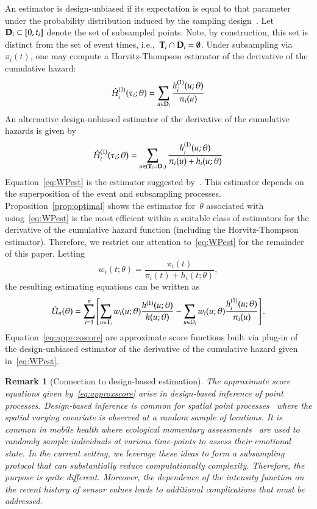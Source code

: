 \documentclass[11pt]{amsart}
\newtheorem{rmk}[thm]{Remark}%
\def\bfT{{\bf T}}
\def\bfD{{\bf D}}
\begin{document}
An estimator is design-unbiased if its expectation is equal to that parameter under the probability distribution induced by the sampling design~\citep{Cassel1977}. Let~$\bfD_i \subset [0,t_i]$ denote the set of subsampled points.  Note, by construction, this set is distinct from the set of event times, i.e.,~$\bfT_i \cap \bfD_i = \emptyset$.  Under subsampling via $\pi_i (t)$, one may compute a Horvitz-Thompson estimator of the derivative of the cumulative hazard:
\[
\hat H_{i}^{(1)} (\tau_i; \theta) = \sum_{u \in \bfD_i} \frac{
  h^{(1)}_i (u; \theta) }{ \pi_i (u) }
\]
An alternative design-unbiased estimator of the derivative of the cumulative hazards is given by
\begin{equation}
\label{eq:WPest}
\hat H_{i}^{(1)} (\tau_i; \theta) = \sum_{u \in (\bfT_i \cup \bfD_i)}
\frac{ h^{(1)}_i ( u; \theta ) }{ \pi_i (u) + h_i ( u ; \theta) }
\end{equation}
Equation~\eqref{eq:WPest} is the estimator suggested by~\cite{Waagepetersen2008}.  This estimator depends on the superposition of the event and subsampling processes. Proposition~\ref{prop:optimal} shows the estimator for~$\theta$ associated with using~\eqref{eq:WPest} is the most efficient within a suitable class of estimators for the derivative of the cumulative hazard function (including the Horvitz-Thompson estimator). Therefore, we restrict our attention to~\eqref{eq:WPest} for the remainder of this paper. Letting
\begin{equation}
\label{eq:waage_weights}
w_i (t; \theta) = \frac{\pi_i (t)}{\pi_i (t) + h_i (t ; \theta)},
\end{equation}
the resulting estimating equations can be written as
\begin{equation}
\label{eq:approxscore}
\hat{U}_n (\theta) = \sum_{i=1}^n \left[ \sum_{u \in \bfT_i} w_i(u; \theta)
  \frac{h^{(1)} (u; \theta)}{ h ( u; \theta)}  - \sum_{u \in D_i} w_i(u;
  \theta) \frac{h_i^{(1)} (u; \theta)}{ \pi_i (u) } \right].
\end{equation}
Equation~\eqref{eq:approxscore} are approximate score functions built via plug-in of the design-unbiased estimator of the derivative of the cumulative hazard given in~\eqref{eq:WPest}.

\begin{rmk}[Connection to design-based estimation]
The approximate score equations given by~\eqref{eq:approxscore} arise in design-based inference of point processes.  Design-based inference is common for spatial point processes~\citep{Waagepetersen2008} where the spatial varying covariate is observed at a random sample of locations. It is common in mobile health where ecological momentary assessments~\citep{Rathbun2012,Rathbun2016} are used to randomly sample individuals at various time-points to assess their emotional state.  In the current setting, we leverage these ideas to form a subsampling protocol that can substantially reduce computationally complexity.  Therefore, the purpose is quite different. Moreover, the dependence of the intensity function on the recent history of sensor values leads to additional complications that must be addressed.
\end{rmk}
\end{document}

